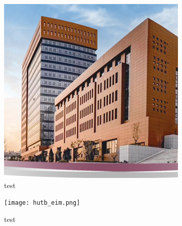 \begin{figure}[!htb]
    \centering
    \begin{subfigure}[t]{0.24\linewidth}
        \begin{minipage}[b]{1\linewidth}
        \includegraphics[width=1\linewidth]{hutb_building.png}
        \caption{test}
        \end{minipage}
    \end{subfigure}
    \begin{subfigure}[t]{0.24\linewidth}
        \begin{minipage}[b]{1\linewidth}
        \texttt{[image: hutb\_eim.png]}
        \caption{test}
        \end{minipage}
    \end{subfigure}
    \begin{subfigure}[t]{0.24\linewidth}
        \begin{minipage}[b]{1\linewidth}

\end{minipage}
\end{subfigure}
\end{figure}

